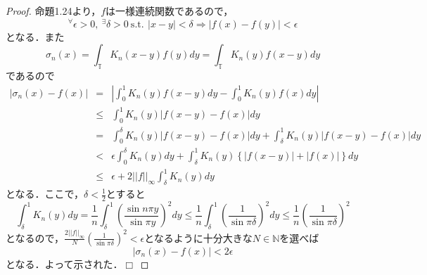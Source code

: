 \documentclass[a4paper,11pt]{jsarticle}
\newtheorem{proof}{証明}
\def\qed{\hfill $\Box$}
\newcommand{\st}{\mathrm{s.t.}\,}  %
\begin{document}
\begin{proof}
命題1.24より，$f$は一様連続関数であるので，
\begin{equation*}
^\forall\epsilon>0,{\ } ^\exists\delta>0{\ }\st{\ }|x-y|<\delta \Longrightarrow |f(x)-f(y)|<\epsilon
\end{equation*}
となる．また
\begin{equation*}
\sigma_n(x)=\int_\mathbb{T}K_n(x-y)f(y)dy=\int_\mathbb{T}K_n(y)f(x-y)dy
\end{equation*}
であるので
\begin{eqnarray*}
|\sigma_n(x)-f(x)|&=&\left|\int_0^1K_n(y)f(x-y)dy-\int_0^1K_n(y)f(x)dy\right| \\
&\leq&\int_0^1K_n(y)|f(x-y)-f(x)|dy \\
&=&\int_0^\delta K_n(y)|f(x-y)-f(x)|dy+\int_\delta^1K_n(y)|f(x-y)-f(x)|dy \\
&<&\epsilon\int_0^\delta K_n(y)dy+\int_\delta^1K_n(y)\left\{|f(x-y)|+|f(x)|\right\}dy \\
&\leq&\epsilon+2||f||_\infty\int_\delta^1K_n(y)dy
\end{eqnarray*}
となる．ここで，$\delta<\frac{1}{2}$とすると
\begin{equation*}
\int_\delta^1K_n(y)dy=\frac{1}{n}\int_\delta^1\left(\frac{\sin{n\pi y}}{\sin{\pi y}}\right)^2dy\leq\frac{1}{n}\int_\delta^1\left(\frac{1}{\sin{\pi\delta}}\right)^2dy\leq\frac{1}{n}\left(\frac{1}{\sin{\pi\delta}}\right)^2
\end{equation*}
となるので，$\frac{2||f||_\infty}{N}\left(\frac{1}{\sin{\pi\delta}}\right)^2<\epsilon$となるように十分大きな$N\in\mathbb{N}$を選べば
\begin{equation*}
|\sigma_n(x)-f(x)|<2\epsilon
\end{equation*}
となる．よって示された．\qed
\end{proof}
%
%
%
%
\newpage
%
%
%
%
\appendix
\end{document}
